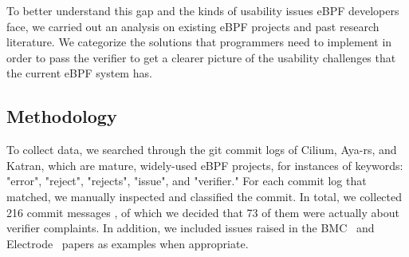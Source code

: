 
To better understand this gap and the kinds of usability issues eBPF
    developers face, we carried out an analysis on existing eBPF projects and
    past research literature.
We categorize the solutions that programmers need to implement in order to pass the verifier to get a clearer picture of the usability challenges that the current eBPF system has.

\subsection{Methodology}
To collect data, we searched through the git commit logs of Cilium, Aya-rs, and
    Katran, which are mature, widely-used eBPF projects, for instances of
    keywords: "error", "reject", "rejects", "issue", and "verifier."
For each commit log that matched, we manually inspected and classified the commit.%
In total, we collected 216 commit messages , of which we decided that 73 of them were actually about verifier complaints.
In addition, we included  issues raised in the BMC~\cite{BMC} and Electrode~\cite{Electrode} papers as examples when appropriate.

